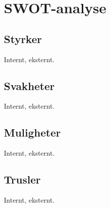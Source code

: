 \section{SWOT-analyse}

\subsection{Styrker}
Internt, eksternt.

\subsection{Svakheter}
Internt, eksternt.

\subsection{Muligheter}
Internt, eksternt.

\subsection{Trusler}
Internt, eksternt.
